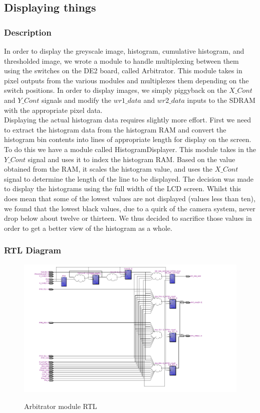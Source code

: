 \documentclass[12pt]{article}
\begin{document}
  
  \subsection{Displaying things}
  \subsubsection{Description}
  In order to display the greyscale image, histogram, cumulative histogram, and thresholded image, we wrote a module to handle multiplexing between them using the switches on the DE2 board, called Arbitrator. This module takes in pixel outputs from the various modules and multiplexes them depending on the switch positions. In order to display images, we simply piggyback on the \(X\_Cont\) and \(Y\_Cont\) signals and modify the \(wr1\_data\) and \(wr2\_data\) inputs to the SDRAM with the appropriate pixel data. \\
      
  Displaying the actual histogram data requires slightly more effort. First we need to extract the histogram data from the histogram RAM and convert the histogram bin contents into lines of appropriate length for display on the screen. To do this we have a module called HistogramDisplayer. This module takes in the \(Y\_Cont\) signal and uses it to index the histogram RAM. Based on the value obtained from the RAM, it scales the histogram value, and uses the \(X\_Cont\) signal to determine the length of the line to be displayed. The decision was made to display the histograms using the full width of the LCD screen. Whilst this does mean that some of the lowest values are not displayed (values less than ten), we found that the lowest black values, due to a quirk of the camera system, never drop below about twelve or thirteen. We thus decided to sacrifice those values in order to get a better view of the histogram as a whole.
  \subsubsection{RTL Diagram}
    \begin{figure}[H]
    \begin{center}
        {\includegraphics[width=\textwidth]{Images/ArbitratorRTL.png}}
    \end{center}
    \caption{Arbitrator module RTL}
    \label{fig:arbitrator_rtl}
  \end{figure} 
\end{document}
